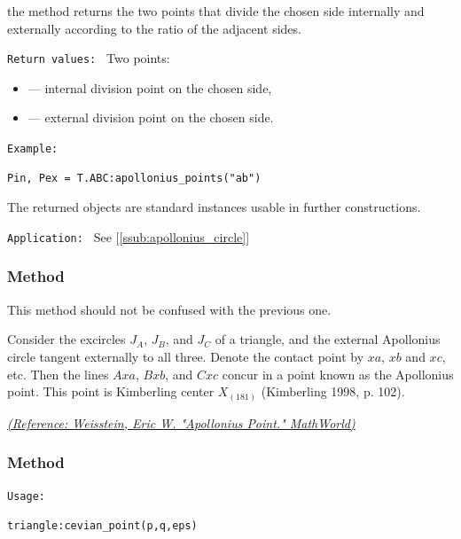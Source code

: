the method  returns the two
points that divide the chosen side internally and externally according to the
ratio of the adjacent sides.

\medskip
\texttt{Return values: }
Two points:
\begin{itemize}
  \item {} — internal division point on the chosen side,
  \item {} — external division point on the chosen side.
\end{itemize}

\medskip

\texttt{Example: }
\begin{verbatim}
Pin, Pex = T.ABC:apollonius_points("ab")
\end{verbatim}

The returned objects are standard  instances usable in further
constructions.

\texttt{Application: } See [\ref{ssub:apollonius_circle}]


\subsubsection{Method }
\label{ssub:apollonius_point}

This method should not be confused with the previous one.

Consider the excircles $J_A$, $J_B$, and $J_C$ of a triangle, and the external Apollonius circle  tangent externally to all three. Denote the contact point  by $xa$, $xb$ and $xc$, etc. Then the lines $Axa$, $Bxb$, and $Cxc$ concur in a point known as the Apollonius point. This point is Kimberling center $X_(181)$ (Kimberling 1998, p. 102).

\begin{flushright}
\small
\href{https://mathworld.wolfram.com/ApolloniusPoint.html}{\textit{(Reference: Weisstein, Eric W. "Apollonius Point." MathWorld)}}
\end{flushright}


\subsubsection{Method }
\label{ssub:cevian_point}

\texttt{Usage: }

\begin{verbatim}
triangle:cevian_point(p,q,eps)
\end{verbatim}

